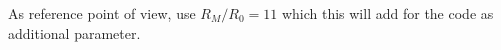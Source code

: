 \documentclass[10pt, a4paper]{report}
\begin{document}
As reference point of view, \textcite{Ianniruberto:2015dv} use $R_M/R_0 = 11$ which this will add for the code as additional parameter.


\end{document}
